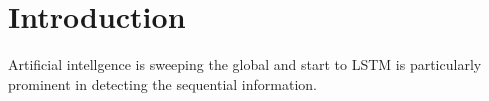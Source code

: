 \section{Introduction}
Artificial intellgence is sweeping the global and start to
LSTM is particularly prominent in detecting the sequential information. 